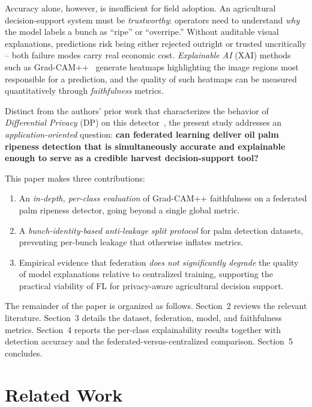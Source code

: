 \documentclass[a4paper,10pt]{article}
\begin{document}
Accuracy alone, however, is insufficient for field adoption. An agricultural
decision-support system must be \emph{trustworthy}: operators need to
understand \emph{why} the model labels a bunch as ``ripe'' or ``overripe.''
Without auditable visual explanations, predictions risk being either rejected
outright or trusted uncritically -- both failure modes carry real economic
cost. \textit{Explainable AI} (XAI) methods such as Grad-CAM++~\cite{gradcampp}
generate heatmaps highlighting the image regions most responsible for a
prediction, and the quality of such heatmaps can be measured quantitatively
through \emph{faithfulness} metrics.

Distinct from the authors' prior work that characterizes the behavior of
\textit{Differential Privacy} (DP) on this detector~\cite{paperA}, the present
study addresses an \emph{application-oriented} question: \textbf{can federated
learning deliver oil palm ripeness detection that is simultaneously accurate
and explainable enough to serve as a credible harvest decision-support tool?}

This paper makes three contributions:

\begin{enumerate}
\item An \emph{in-depth, per-class evaluation} of Grad-CAM++ faithfulness on
a federated palm ripeness detector, going beyond a single global metric.
\item A \emph{bunch-identity-based anti-leakage split protocol} for palm
detection datasets, preventing per-bunch leakage that otherwise inflates
metrics.
\item Empirical evidence that federation \emph{does not significantly degrade}
the quality of model explanations relative to centralized training, supporting
the practical viability of FL for privacy-aware agricultural decision support.
\end{enumerate}

The remainder of the paper is organized as follows. Section~2 reviews the
relevant literature. Section~3 details the dataset, federation, model, and
faithfulness metrics. Section~4 reports the per-class explainability results
together with detection accuracy and the federated-versus-centralized
comparison. Section~5 concludes.

\section{Related Work}
\end{document}
